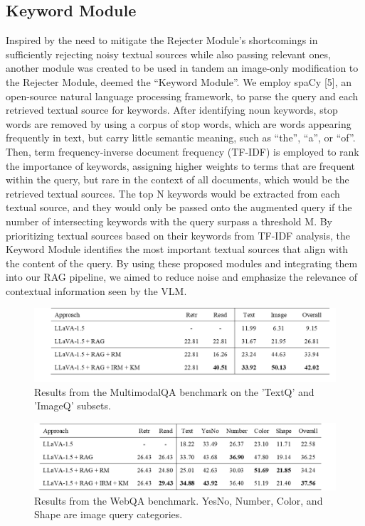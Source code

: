 \documentclass[twocolumn]{article}
\begin{document}
\subsection{Keyword Module}
Inspired by the need to mitigate the Rejecter Module’s shortcomings in sufficiently rejecting noisy textual sources while also passing relevant ones, another module was created to be used in tandem an image-only modification to the Rejecter Module, deemed the “Keyword Module”. We employ spaCy [5], an open-source natural language processing framework, to parse the query and each retrieved textual source for keywords. After identifying noun keywords, stop words are removed by using a corpus of stop words, which are words appearing frequently in text, but carry little semantic meaning, such as “the”, “a”, or “of”. Then, term frequency-inverse document frequency (TF-IDF) is employed to rank the importance of keywords, assigning higher weights to terms that are frequent within the query, but rare in the context of all documents, which would be the retrieved textual sources. The top N keywords would be extracted from each textual source, and they would only be passed onto the augmented query if the number of intersecting keywords with the query surpass a threshold M. By prioritizing textual sources based on their keywords from TF-IDF analysis, the Keyword Module identifies the most important textual sources that align with the content of the query.
By using these proposed modules and integrating them into our RAG pipeline, we aimed to reduce noise and emphasize the relevance of contextual information seen by the VLM.

\begin{figure}
    \centering
    \includegraphics[width=1\linewidth]{image2.png}
    \caption{Results from the MultimodalQA benchmark on the 'TextQ' and 'ImageQ' subsets.}
    \label{fig:enter-label}
\end{figure}

\begin{figure}
    \centering
    \includegraphics[width=1\linewidth]{image3.png}
    \caption{Results from the WebQA benchmark. YesNo, Number, Color, and Shape are image query categories.}
    \label{fig:enter-label}
\end{figure}
\end{document}
